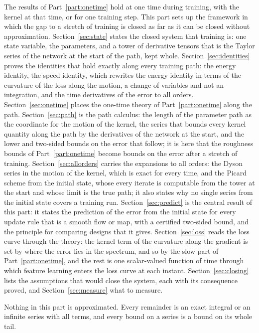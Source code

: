 \documentclass[11pt]{article}
\theoremstyle{definition}
\theoremstyle{remark}
\begin{document}
The results of Part~\ref{part:onetime} hold at one time during training, with the kernel at that time, or for one training step.
This part sets up the framework in which the gap to a stretch of training is closed as far as it can be closed without approximation.
Section~\ref{sec:state} states the closed system that training is: one state variable, the parameters, and a tower of derivative tensors that is the Taylor series of the network at the start of the path, kept whole.
Section~\ref{sec:identities} proves the identities that hold exactly along every training path: the energy identity, the speed identity, which rewrites the energy identity in terms of the curvature of the loss along the motion, a change of variables and not an integration, and the time derivatives of the error to all orders.
Section~\ref{sec:onetime} places the one-time theory of Part~\ref{part:onetime} along the path.
Section~\ref{sec:path} is the path calculus: the length of the parameter path as the coordinate for the motion of the kernel, the series that bounds every kernel quantity along the path by the derivatives of the network at the start, and the lower and two-sided bounds on the error that follow; it is here that the roughness bounds of Part~\ref{part:onetime} become bounds on the error after a stretch of training.
Section~\ref{sec:allorders} carries the expansions to all orders: the Dyson series in the motion of the kernel, which is exact for every time, and the Picard scheme from the initial state, whose every iterate is computable from the tower at the start and whose limit is the true path; it also states why no single series from the initial state covers a training run.
Section~\ref{sec:predict} is the central result of this part: it states the prediction of the error from the initial state for every update rule that is a smooth flow or map, with a certified two-sided bound, and the principle for comparing designs that it gives.
Section~\ref{sec:loss} reads the loss curve through the theory: the kernel term of the curvature along the gradient is set by where the error lies in the spectrum, and so by the slow part of Part~\ref{part:onetime}, and the rest is one scalar-valued function of time through which feature learning enters the loss curve at each instant.
Section~\ref{sec:closing} lists the assumptions that would close the system, each with its consequence proved, and Section~\ref{sec:measure} what to measure.

Nothing in this part is approximated.
Every remainder is an exact integral or an infinite series with all terms, and every bound on a series is a bound on its whole tail.
\end{document}
